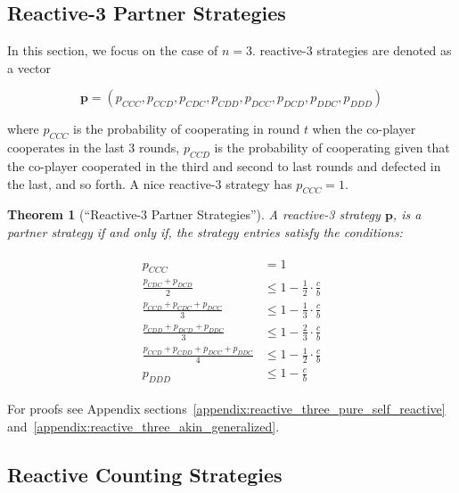 \documentclass[11pt]{article}
\theoremstyle{plainCl1}
\newtheorem{theorem}{Theorem}
\theoremstyle{plainCl2}
\begin{document}

\subsection{Reactive-3 Partner Strategies}\label{section:reactive_three_partner_strategies}

In this section, we focus on the case of $n=3$. reactive-3 strategies are
denoted as a vector 

$$\mathbf{p}=(p_{CCC}, p_{CCD}, p_{CDC}, p_{CDD}, p_{DCC}, p_{DCD}, p_{DDC}, p_{DDD})$$

where $p_{CCC}$ is the probability of cooperating in round $t$ when the
co-player cooperates in the last 3 rounds, $p_{CCD}$ is the probability of
cooperating given that the co-player cooperated in the third and second to last
rounds and defected in the last, and so forth. A nice reactive-3 strategy
has $p_{CCC} = 1$.

\begin{theorem}[``Reactive-3 Partner Strategies'']\label{theorem:reactive_three_partner_strategies}
A reactive-3 strategy $\mathbf{p}$, is a partner strategy if and only if,
the strategy entries satisfy the conditions:

\begin{align}\label{eq:three_bit_conditions}
  \begin{split}
  p_{CCC} & = 1 \\
  \frac{p_{CDC} + p_{DCD}}{2} & \leq 1 - \frac{1}{2} \cdot \frac{c}{b} \\
  \frac{p_{CCD} + p_{CDC} + p_{DCC}}{3} & \leq 1 - \frac{1}{3} \cdot \frac{c}{b} \\
  \frac{p_{CDD} + p_{DCD} + p_{DDC}}{3} & \leq 1 - \frac{2}{3} \cdot \frac{c}{b} \\
  \frac{p_{CCD} + p_{CDD} + p_{DCC} + p_{DDC}}{4}  & \leq 1 - \frac{1}{2} \cdot \frac{c}{b}  \\
  p_{DDD} & \leq 1\!-\! \frac{c}{b}
  \end{split}
\end{align}
\end{theorem}

For proofs see Appendix sections~\ref{appendix:reactive_three_pure_self_reactive}
and~\ref{appendix:reactive_three_akin_generalized}.


\subsection{Reactive Counting Strategies}
\end{document}
